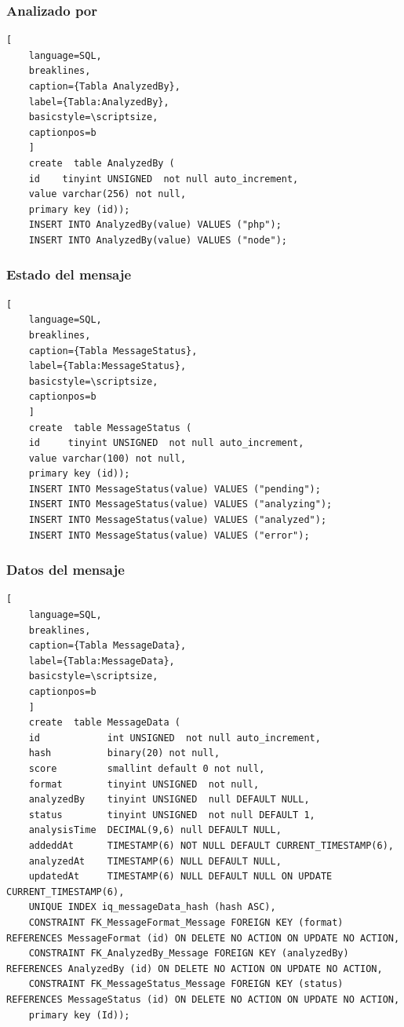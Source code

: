 \subsubsection{Analizado por}
\begin{lstlisting}[
    language=SQL,
    breaklines, 
    caption={Tabla AnalyzedBy}, 
    label={Tabla:AnalyzedBy}, 
    basicstyle=\scriptsize,
    captionpos=b
    ]
    create  table AnalyzedBy (
    id    tinyint UNSIGNED  not null auto_increment, 
    value varchar(256) not null, 
    primary key (id));
    INSERT INTO AnalyzedBy(value) VALUES ("php");
    INSERT INTO AnalyzedBy(value) VALUES ("node");
\end{lstlisting}

\subsubsection{Estado del mensaje}
\begin{lstlisting}[
    language=SQL,
    breaklines, 
    caption={Tabla MessageStatus}, 
    label={Tabla:MessageStatus}, 
    basicstyle=\scriptsize,
    captionpos=b
    ]
    create  table MessageStatus (
    id     tinyint UNSIGNED  not null auto_increment, 
    value varchar(100) not null, 
    primary key (id));
    INSERT INTO MessageStatus(value) VALUES ("pending");
    INSERT INTO MessageStatus(value) VALUES ("analyzing");
    INSERT INTO MessageStatus(value) VALUES ("analyzed");
    INSERT INTO MessageStatus(value) VALUES ("error");
\end{lstlisting}

\subsubsection{Datos del mensaje}
\begin{lstlisting}[
    language=SQL,
    breaklines, 
    caption={Tabla MessageData}, 
    label={Tabla:MessageData}, 
    basicstyle=\scriptsize,
    captionpos=b
    ]
    create  table MessageData (
    id            int UNSIGNED  not null auto_increment, 
    hash          binary(20) not null, 
    score         smallint default 0 not null, 
    format        tinyint UNSIGNED  not null, 
    analyzedBy    tinyint UNSIGNED  null DEFAULT NULL, 
    status        tinyint UNSIGNED  not null DEFAULT 1, 
    analysisTime  DECIMAL(9,6) null DEFAULT NULL,
    addeddAt      TIMESTAMP(6) NOT NULL DEFAULT CURRENT_TIMESTAMP(6),
    analyzedAt    TIMESTAMP(6) NULL DEFAULT NULL,
    updatedAt     TIMESTAMP(6) NULL DEFAULT NULL ON UPDATE CURRENT_TIMESTAMP(6),
    UNIQUE INDEX iq_messageData_hash (hash ASC),
    CONSTRAINT FK_MessageFormat_Message FOREIGN KEY (format) REFERENCES MessageFormat (id) ON DELETE NO ACTION ON UPDATE NO ACTION,
    CONSTRAINT FK_AnalyzedBy_Message FOREIGN KEY (analyzedBy) REFERENCES AnalyzedBy (id) ON DELETE NO ACTION ON UPDATE NO ACTION,
    CONSTRAINT FK_MessageStatus_Message FOREIGN KEY (status) REFERENCES MessageStatus (id) ON DELETE NO ACTION ON UPDATE NO ACTION,
    primary key (Id));
\end{lstlisting}

